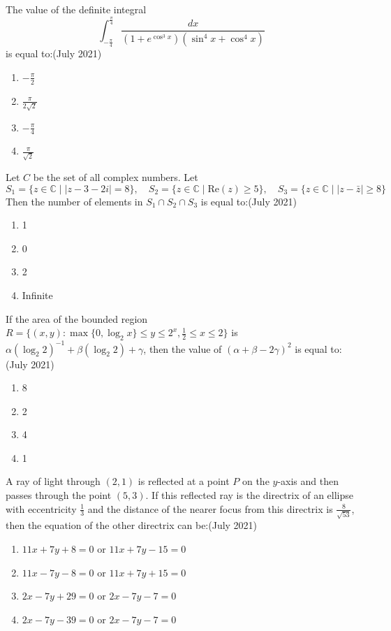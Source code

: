 \item
The value of the definite integral
\begin{equation*}
\int_{-\frac{\pi}{4}}^{\frac{\pi}{4}} \frac{dx}{(1 + e^{\cos^3 x})(\sin^4 x + \cos^4 x)}
\end{equation*}
is equal to:\hfill{(July 2021)}
\begin{enumerate}
    \item $-\frac{\pi}{2}$
    \item $\frac{\pi}{2\sqrt{2}}$
    \item $-\frac{\pi}{4}$
    \item $\frac{\pi}{\sqrt{2}}$
\end{enumerate}

\item
Let $ C $ be the set of all complex numbers. Let  
$
S_1 = \{z \in \mathbb{C} \mid |z - 3 - 2i| = 8 \}, \quad
S_2 = \{z \in \mathbb{C} \mid \text{Re}(z) \geq 5\}, \quad
S_3 = \{z \in \mathbb{C} \mid |z - \bar{z}| \geq 8 \}$
Then the number of elements in $ S_1 \cap S_2 \cap S_3 $ is equal to:\hfill{(July 2021)}
\begin{enumerate}
    \item 1
    \item 0
    \item 2
    \item Infinite
\end{enumerate}

\item
If the area of the bounded region
$
R = \{ (x, y) : \max\{0, \log_2 x\} \leq y \leq 2^x, \frac{1}{2} \leq x \leq 2\}
$
is $ \alpha(\log_2 2)^{-1} + \beta(\log_2 2) + \gamma $, then the value of
$
(\alpha + \beta - 2\gamma)^2
$
is equal to:\hfill{(July 2021)}
\begin{enumerate}
    \item 8
    \item 2
    \item 4
    \item 1
\end{enumerate}

\item A ray of light through $ (2, 1) $ is reflected at a point $ P $ on the $ y $-axis and then passes through the point $ (5, 3) $. If this reflected ray is the directrix of an ellipse with eccentricity $ \frac{1}{3} $ and the distance of the nearer focus from this directrix is $ \frac{8}{\sqrt{53}} $, then the equation of the other directrix can be:\hfill{(July 2021)}
\begin{enumerate}
    \item $11x + 7y + 8 = 0$ or $11x + 7y - 15 = 0$
    \item $11x - 7y - 8 = 0$ or $11x + 7y + 15 = 0$
    \item $2x - 7y + 29 = 0$ or $2x - 7y - 7 = 0$
    \item $2x-7y-39=0$ or $2x-7y-7=0$
\end{enumerate}

